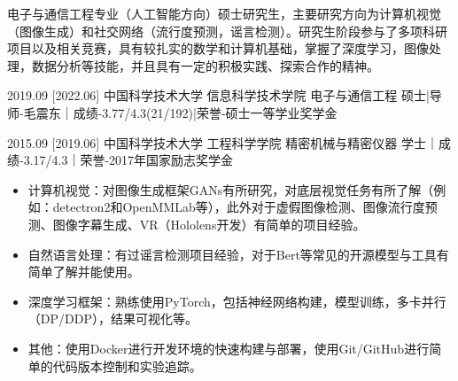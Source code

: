 \documentclass[zh]{resume}
\begin{document}
\makeheader

{\onehalfspacing\hspace{2em}%
电子与通信工程专业（人工智能方向）硕士研究生，主要研究方向为计算机视觉（图像生成）和社交网络（流行度预测，谣言检测）。研究生阶段参与了多项科研项目以及相关竞赛，具有较扎实的数学和计算机基础，掌握了深度学习，图像处理，数据分析等技能，并且具有一定的积极实践、探索合作的精神。
\par}

\begin{competences}
\end{competences}

\begin{educations}
  \education%
    {2019.09}%
    [2022.06]%
    {中国科学技术大学}%
    {信息科学技术学院}%
    {电子与通信工程}%
    {硕士|导师-毛震东｜成绩-3.77/4.3(21/192)|荣誉-硕士一等学业奖学金}

  \separator{0.5ex}
  \education%
    {2015.09}%
    [2019.06]%
    {中国科学技术大学}%
    {工程科学学院}%
    {精密机械与精密仪器}%
    {学士｜成绩-3.17/4.3｜荣誉-2017年国家励志奖学金}
\end{educations}

\begin{itemize}
  \item 计算机视觉：对图像生成框架GANs有所研究，对底层视觉任务有所了解（例如：detectron2和OpenMMLab等），此外对于虚假图像检测、图像流行度预测、图像字幕生成、VR（Hololens开发）有简单的项目经验。
  \item 自然语言处理：有过谣言检测项目经验，对于Bert等常见的开源模型与工具有简单了解并能使用。
  \item 深度学习框架：熟练使用PyTorch，包括神经网络构建，模型训练，多卡并行（DP/DDP），结果可视化等。
  \item 其他：使用Docker进行开发环境的快速构建与部署，使用Git/GitHub进行简单的代码版本控制和实验追踪。
\end{itemize}
\end{document}
